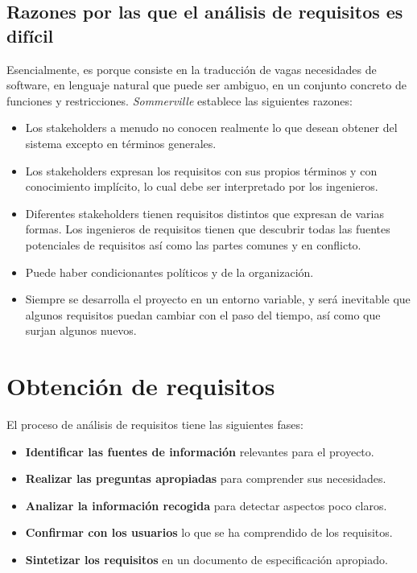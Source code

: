 \subsection{Razones por las que el análisis de requisitos es difícil}

Esencialmente, es porque consiste en la traducción de vagas necesidades de software, en lenguaje natural que puede ser ambiguo, en un conjunto concreto de funciones y restricciones. \textit{Sommerville} establece las siguientes razones:

\begin{itemize}
    \item Los stakeholders a menudo no conocen realmente lo que desean obtener del sistema excepto en términos generales.
    \item Los stakeholders expresan los requisitos con sus propios términos y con conocimiento implícito, lo cual debe ser interpretado por los ingenieros.
    \item Diferentes stakeholders tienen requisitos distintos que expresan de varias formas. Los ingenieros de requisitos tienen que descubrir todas las fuentes potenciales de requisitos así como las partes comunes y en conflicto.
    \item Puede haber condicionantes políticos y de la organización.
    \item Siempre se desarrolla el proyecto en un entorno variable, y será inevitable que algunos requisitos puedan cambiar con el paso del tiempo, así como que surjan algunos nuevos.
\end{itemize}

\section{Obtención de requisitos}

El proceso de análisis de requisitos tiene las siguientes fases:

\begin{itemize}
    \item \textbf{Identificar las fuentes de información} relevantes para el proyecto.
    \item \textbf{Realizar las preguntas apropiadas} para comprender sus necesidades.
    \item \textbf{Analizar la información recogida} para detectar aspectos poco claros.
    \item \textbf{Confirmar con los usuarios} lo que se ha comprendido de los requisitos.
    \item \textbf{Sintetizar los requisitos} en un documento de especificación apropiado.
\end{itemize}

